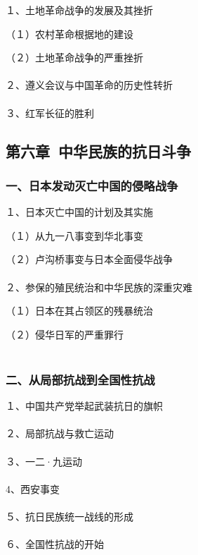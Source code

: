 \documentclass{ctexart}
\begin{document}
１、土地革命战争的发展及其挫折

（１）农村革命根据地的建设

（２）土地革命战争的严重挫折
\\\\

２、遵义会议与中国革命的历史性转折
\\\\

３、红军长征的胜利

\subsection{第六章\ 中华民族的抗日斗争}

\subsubsection{一、日本发动灭亡中国的侵略战争}

１、日本灭亡中国的计划及其实施

（１）从九一八事变到华北事变

（２）卢沟桥事变与日本全面侵华战争
\\\\

２、参保的殖民统治和中华民族的深重灾难

（１）日本在其占领区的残暴统治

（２）侵华日军的严重罪行
\\\\

\subsubsection{二、从局部抗战到全国性抗战}

１、中国共产党举起武装抗日的旗帜
\\\\

２、局部抗战与救亡运动
\\\\

３、一二·九运动
\\\\

4、西安事变
\\\\

５、抗日民族统一战线的形成
\\\\

６、全国性抗战的开始
\end{document}
